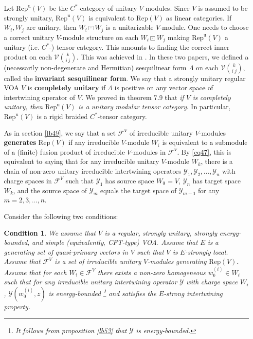 \documentclass[12pt,a4paper]{article}
\theoremstyle{definition}
\theoremstyle{plain}
\newtheorem{cond}{Condition}
\newcommand{\mc}{\mathcal}
\newcommand{\RepV}{\mathrm{Rep}(V)}
\newcommand{\RepuV}{\mathrm{Rep}^{\mathrm u}(V)}
\numberwithin{equation}{subsection}
\begin{document}
Let $\RepuV$ be the $C^*$-category of unitary $V$-modules. Since $V$ is assumed to be strongly unitary, $\RepuV$ is equivalent to $\RepV$ as linear categories. If $W_i,W_j$ are unitary, then $W_i\boxdot W_j$ is a unitarizable $V$-module. One needs to choose a correct unitary $V$-module structure on each $W_i\boxdot W_j$  making $\RepuV$ a unitary (i.e. $C^*$-) tensor category. This amounts to finding the correct inner product on each $\mc V{k\choose i~j}$. This was achieved in \cite{Gui19a,Gui19b}. In these two papers, we defined a (necessarily non-degenerate and Hermitian) sesquilinear form $\Lambda$ on each $\mc V{k\choose i~j}$, called the \textbf{invariant sesquilinear form}. We say that a strongly unitary regular VOA $V$ is \textbf{completely unitary} if $\Lambda$ is positive on any vector space of intertwining operator of $V$. We proved in \cite{Gui19b} theorem 7.9 that \emph{if $V$ is completely unitary, then $\RepuV$ is a unitary modular tensor category}. In particular, $\RepuV$ is a rigid braided $C^*$-tensor category. 

As in section \ref{lb49}, we say that a set $\mc F^V$ of irreducible unitary $V$-modules  \textbf{generates} $\RepV$ if any irreducible $V$-module $W_i$ is equivalent to a submodule of a (finite) fusion product of irreducible $V$-modules in $\mc F^V$. By \eqref{eq47}, this is equivalent to saying that for any irreducible unitary $V$-module $W_k$, there is a chain of non-zero unitary irreducible intertwining operators $\mc Y_1,\mc Y_2,\dots,\mc Y_n$ with charge spaces in $\mc F^V$ such that $\mc Y_1$ has source space $W_0=V$, $\mc Y_n$ has target space $W_k$, and the source space of $\mc Y_m$ equals the target space of $\mc Y_{m-1}$ for any $m=2,3,\dots,n$.

Consider the following two conditions:

\begin{cond}\label{cd1}
We assume that $V$ is a regular, strongly unitary, strongly energy-bounded, and simple (equivalently, CFT-type) VOA. Assume that $E$ is a generating set of quasi-primary vectors in $V$ such that $V$ is $E$-strongly local. Assume that $\mc F^V$ is a set of irreducible unitary $V$-modules generating $\RepV$. Assume that for each $W_i\in \mc F^V$ there exists a non-zero homogeneous $w^{(i)}_0\in W_i$ such that for any irreducible unitary intertwining operator $\mc Y$ with charge space $W_i$, $\mc Y(w^{(i)}_0,z)$ is energy-bounded \footnote{It follows from proposition \ref{lb53} that $\mc Y$ is energy-bounded.} and satisfies the $E$-strong intertwining property.
\end{cond}
\end{document}
